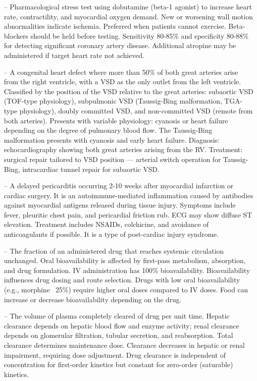 -- Pharmacological stress test using dobutamine (beta-1 agonist) to increase heart rate, contractility, and myocardial oxygen demand. New or worsening wall motion abnormalities indicate ischemia. Preferred when patients cannot exercise. Beta-blockers should be held before testing. Sensitivity 80-85\% and specificity 80-88\% for detecting significant coronary artery disease. Additional atropine may be administered if target heart rate not achieved.

-- A congenital heart defect where more than 50\% of both great arteries arise from the right ventricle, with a VSD as the only outlet from the left ventricle. Classified by the position of the VSD relative to the great arteries: subaortic VSD (TOF-type physiology), subpulmonic VSD (Taussig-Bing malformation, TGA-type physiology), doubly committed VSD, and non-committed VSD (remote from both arteries). Presents with variable physiology: cyanosis or heart failure depending on the degree of pulmonary blood flow. The Taussig-Bing malformation presents with cyanosis and early heart failure. Diagnosis: echocardiography showing both great arteries arising from the RV. Treatment: surgical repair tailored to VSD position — arterial switch operation for Taussig-Bing, intracardiac tunnel repair for subaortic VSD.

-- A delayed pericarditis occurring 2-10 weeks after myocardial infarction or cardiac surgery. It is an autoimmune-mediated inflammation caused by antibodies against myocardial antigens released during tissue injury. Symptoms include fever, pleuritic chest pain, and pericardial friction rub. ECG may show diffuse ST elevation. Treatment includes NSAIDs, colchicine, and avoidance of anticoagulants if possible. It is a type of post-cardiac injury syndrome.

-- The fraction of an administered drug that reaches systemic circulation unchanged. Oral bioavailability is affected by first-pass metabolism, absorption, and drug formulation. IV administration has 100\% bioavailability. Bioavailability influences drug dosing and route selection. Drugs with low oral bioavailability (e.g., morphine ~25\%) require higher oral doses compared to IV doses. Food can increase or decrease bioavailability depending on the drug.

-- The volume of plasma completely cleared of drug per unit time. Hepatic clearance depends on hepatic blood flow and enzyme activity; renal clearance depends on glomerular filtration, tubular secretion, and reabsorption. Total clearance determines maintenance dose. Clearance decreases in hepatic or renal impairment, requiring dose adjustment. Drug clearance is independent of concentration for first-order kinetics but constant for zero-order (saturable) kinetics.

